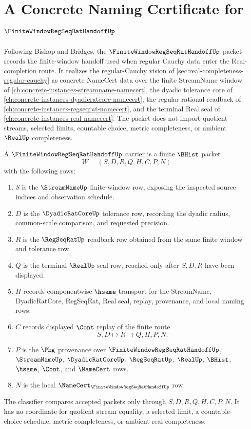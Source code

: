 \chapter{A Concrete Naming Certificate for $\FiniteWindowRegSeqRatHandoffUp$}
\label{ch:concrete-instances-finite-window-regseqrat-handoff-namecert}

Following Bishop and Bridges, the $\FiniteWindowRegSeqRatHandoffUp$ packet records the finite-window handoff used when regular Cauchy data enter the Real-completion route. It realizes the regular-Cauchy vision of \autoref{sec:real-completeness-regular-cauchy} as concrete NameCert data over the finite StreamName window of \autoref{ch:concrete-instances-streamname-namecert}, the dyadic tolerance core of \autoref{ch:concrete-instances-dyadicratcore-namecert}, the regular rational readback of \autoref{ch:concrete-instances-regseqrat-namecert}, and the terminal Real seal of \autoref{ch:concrete-instances-real-namecert}. The packet does not import quotient streams, selected limits, countable choice, metric completeness, or ambient $\RealUp$ completeness.

\begin{definition}
\label{def:finite-window-regseqrat-handoff}
A $\FiniteWindowRegSeqRatHandoffUp$ carrier is a finite $\BHist$ packet
$$
W=(S,D,R,Q,H,C,P,N)
$$
with the following rows:
\begin{enumerate}
\item $S$ is the $\StreamNameUp$ finite-window row, exposing the inspected source indices and observation schedule.
\item $D$ is the $\DyadicRatCoreUp$ tolerance row, recording the dyadic radius, common-scale comparison, and requested precision.
\item $R$ is the $\RegSeqRatUp$ readback row obtained from the same finite window and tolerance row.
\item $Q$ is the terminal $\RealUp$ seal row, reached only after $S,D,R$ have been displayed.
\item $H$ records componentwise $\hsame$ transport for the StreamName, DyadicRatCore, RegSeqRat, Real seal, replay, provenance, and local naming rows.
\item $C$ records displayed $\Cont$ replay of the finite route
$$
S,D \longmapsto R \longmapsto Q,H,P,N .
$$
\item $P$ is the $\Pkg$ provenance over $\FiniteWindowRegSeqRatHandoffUp$, $\StreamNameUp$, $\DyadicRatCoreUp$, $\RegSeqRatUp$, $\RealUp$, $\BHist$, $\hsame$, $\Cont$, and $\NameCert$ rows.
\item $N$ is the local $\NameCert_{\FiniteWindowRegSeqRatHandoffUp}$ row.
\end{enumerate}
The classifier compares accepted packets only through $S,D,R,Q,H,C,P,N$. It has no coordinate for quotient stream equality, a selected limit, a countable-choice schedule, metric completeness, or ambient real completeness.
\end{definition}

